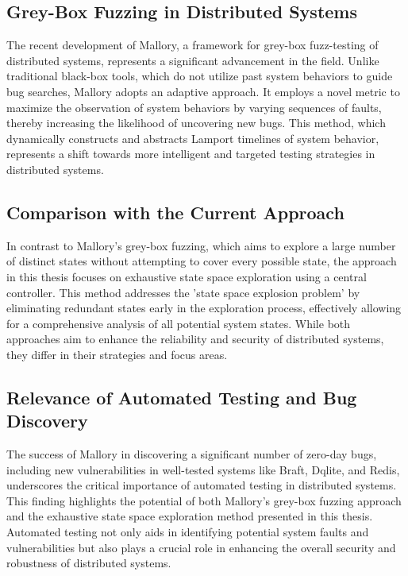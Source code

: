 \documentclass[a4paper,11pt,oneside]{report}
\begin{document}
\subsection{Grey-Box Fuzzing in Distributed Systems}
The recent development of Mallory, a framework for grey-box fuzz-testing of distributed systems, represents a significant advancement in the field. Unlike traditional black-box tools, which do not utilize past system behaviors to guide bug searches, Mallory adopts an adaptive approach. It employs a novel metric to maximize the observation of system behaviors by varying sequences of faults, thereby increasing the likelihood of uncovering new bugs. This method, which dynamically constructs and abstracts Lamport timelines of system behavior, represents a shift towards more intelligent and targeted testing strategies in distributed systems.

\subsection{Comparison with the Current Approach}
In contrast to Mallory's grey-box fuzzing, which aims to explore a large number of distinct states without attempting to cover every possible state, the approach in this thesis focuses on exhaustive state space exploration using a central controller. This method addresses the 'state space explosion problem' by eliminating redundant states early in the exploration process, effectively allowing for a comprehensive analysis of all potential system states. While both approaches aim to enhance the reliability and security of distributed systems, they differ in their strategies and focus areas.

\subsection{Relevance of Automated Testing and Bug Discovery}
The success of Mallory in discovering a significant number of zero-day bugs, including new vulnerabilities in well-tested systems like Braft, Dqlite, and Redis, underscores the critical importance of automated testing in distributed systems. This finding highlights the potential of both Mallory's grey-box fuzzing approach and the exhaustive state space exploration method presented in this thesis. Automated testing not only aids in identifying potential system faults and vulnerabilities but also plays a crucial role in enhancing the overall security and robustness of distributed systems.
\end{document}
